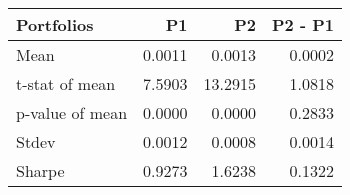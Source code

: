 \begin{tabular}{lrrr}
\toprule
Portfolios & P1 & P2 & P2 - P1 \\
\midrule
Mean & 0.0011 & 0.0013 & 0.0002 \\
t-stat of mean & 7.5903 & 13.2915 & 1.0818 \\
p-value of mean & 0.0000 & 0.0000 & 0.2833 \\
Stdev & 0.0012 & 0.0008 & 0.0014 \\
Sharpe & 0.9273 & 1.6238 & 0.1322 \\
\bottomrule
\end{tabular}
